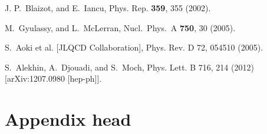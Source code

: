 \documentclass[preprint]{ptephy_v1}%
\begin{document}

\begin{thebibliography}{9}

J. P.~Blaizot, and E.~Iancu, Phys. Rep. {\bf 359}, 355 (2002).

M.~Gyulassy, and L.~McLerran, Nucl.\ Phys.\  A {\bf 750}, 30 (2005). \\ 

S.~Aoki et al. [JLQCD Collaboration], Phys. Rev. D 72, 054510 (2005). \\

S.~Alekhin, A.~Djouadi, and S.~Moch, Phys. Lett. B 716, 214 (2012) [arXiv:1207.0980 [hep-ph]]. 

\end{thebibliography}

\appendix

\section{Appendix head}
\end{document}
